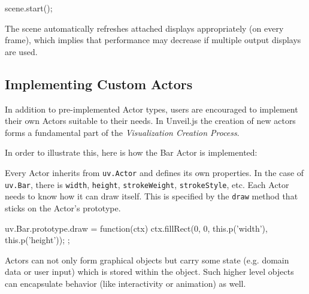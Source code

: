 \begin{english}
\begin{program}
\begin{CppSourceCode}
scene.start();
\end{CppSourceCode}
\end{program}


\SuperPar The scene automatically refreshes attached displays appropriately (on every frame), which implies that performance may decrease if multiple output displays are used.

\subsection{Implementing Custom Actors}

In addition to pre-implemented Actor types, users are encouraged to implement their own Actors suitable to their needs. In Unveil.js the creation of new actors forms a fundamental part of the \emph{Visualization Creation Process}.

\SuperPar In order to illustrate this, here is how the Bar Actor is implemented:

\begin{program}
\end{program}

\SuperPar Every Actor inherits from \texttt{uv.Actor} and defines its own properties. In the case of \texttt{uv.Bar}, there is \texttt{width}, \texttt{height}, \texttt{strokeWeight}, \texttt{strokeStyle}, etc. Each Actor needs to know how it can draw itself. This is specified by the \texttt{draw} method that sticks on the Actor's prototype.

\begin{program}
\begin{CppSourceCode}
uv.Bar.prototype.draw = function(ctx) {
  ctx.fillRect(0, 0, this.p('width'), this.p('height'));
};
\end{CppSourceCode}
\end{program}

\SuperPar Actors can not only form graphical objects but carry some state (e.g. domain data or user input) which is stored within the object. Such higher level objects can encapsulate behavior (like interactivity or animation) as well.



\end{english}

